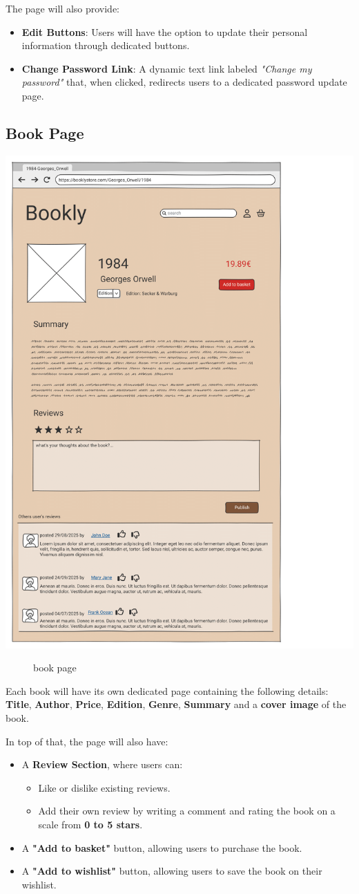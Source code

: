 The page will also provide:
\begin{itemize}
    \item \textbf{Edit Buttons}: Users will have the option to update their personal information through dedicated buttons.
    \item \textbf{Change Password Link}: A dynamic text link labeled \textit{"Change my password"} that, when clicked, redirects users to a dedicated password update page.
\end{itemize}


\subsection{Book Page} \label{sec:book}

\includegraphics[width=0.6\linewidth]{HW1Report/photos/bookpage2.png}

\begin{figure}[h!]
    \centering
    \caption{book page}
    \label{fig:enter-label}
\end{figure}
Each book will have its own dedicated page containing the following details: \textbf{Title}, \textbf{Author}, \textbf{Price}, \textbf{Edition}, \textbf{Genre}, \textbf{Summary} and a \textbf{cover image} of the book.

In top of that, the page will also have:
\begin{itemize}
    \item A \textbf{Review Section}, where users can:
    \begin{itemize}
        \item Like or dislike existing reviews.
        \item Add their own review by writing a comment and rating the book on a scale from \textbf{0 to 5 stars}.
    \end{itemize}
    \item A \textbf{"Add to basket"} button, allowing users to purchase the book.
    \item A \textbf{"Add to wishlist"} button, allowing users to save the book on their wishlist.
\end{itemize}



